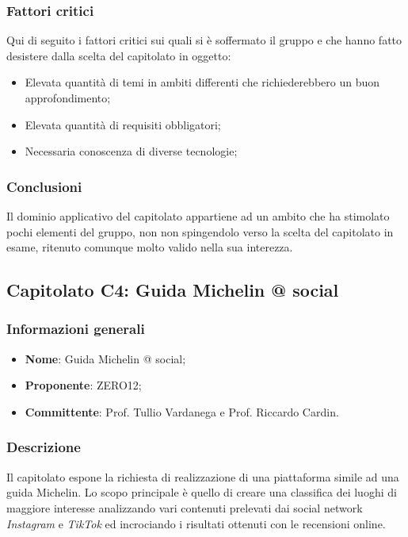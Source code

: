 \documentclass[11pt]{article}
\begin{document}
    \subsubsection{Fattori critici}
    Qui di seguito i fattori critici sui quali si è soffermato il gruppo e che hanno fatto desistere dalla scelta del capitolato in
    oggetto:
    \begin{itemize}
    	\item Elevata quantità di temi in ambiti differenti che richiederebbero un buon approfondimento;
    	\item Elevata quantità di requisiti obbligatori;
    	\item Necessaria conoscenza di diverse tecnologie;
    \end{itemize}
    
    \subsubsection{Conclusioni}
    Il dominio applicativo del capitolato appartiene ad un ambito che ha stimolato pochi elementi del gruppo, non non spingendolo
    verso la scelta del capitolato in esame, ritenuto comunque molto valido nella sua interezza.    
    
\newpage


\subsection{Capitolato C4: Guida Michelin @ social}

    \subsubsection{Informazioni generali}
    \begin{itemize}
        \item \textbf{Nome}: Guida Michelin @ social;
        \item \textbf{Proponente}: ZERO12;
        \item \textbf{Committente}: Prof. Tullio Vardanega e Prof. Riccardo Cardin.
    \end{itemize}
    
    \subsubsection{Descrizione}
    Il capitolato espone la richiesta di realizzazione di una piattaforma simile ad una guida Michelin. Lo scopo principale è quello
    di creare una classifica dei luoghi di maggiore interesse analizzando vari contenuti prelevati dai social network \textit{Instagram}
    e \textit{TikTok} ed incrociando i risultati ottenuti con le recensioni online.
    
\end{document}
